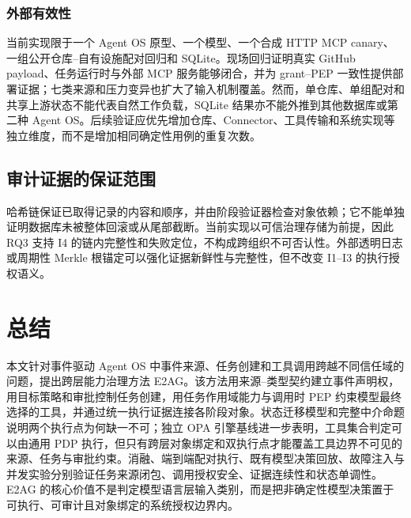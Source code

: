 \subsubsection{外部有效性}

当前实现限于一个 Agent OS 原型、一个模型、一个合成 HTTP MCP canary、一组公开仓库--自有设施配对回归和 SQLite。现场回归证明真实 GitHub payload、任务运行时与外部 MCP 服务能够闭合，并为 grant--PEP 一致性提供部署证据；七类来源和压力变异也扩大了输入机制覆盖。然而，单仓库、单组配对和共享上游状态不能代表自然工作负载，SQLite 结果亦不能外推到其他数据库或第二种 Agent OS。后续验证应优先增加仓库、Connector、工具传输和系统实现等独立维度，而不是增加相同确定性用例的重复次数。

\subsection{审计证据的保证范围}

哈希链保证已取得记录的内容和顺序，并由阶段验证器检查对象依赖；它不能单独证明数据库未被整体回滚或从尾部截断。当前实现以可信治理存储为前提，因此 RQ3 支持 I4 的链内完整性和失败定位，不构成跨组织不可否认性。外部透明日志或周期性 Merkle 根锚定可以强化证据新鲜性与完整性，但不改变 I1--I3 的执行授权语义。

\section{总结}\label{sec:conclusion-v11}

本文针对事件驱动 Agent OS 中事件来源、任务创建和工具调用跨越不同信任域的问题，提出跨层能力治理方法 E2AG。该方法用来源--类型契约建立事件声明权，用目标策略和审批控制任务创建，用任务作用域能力与调用时 PEP 约束模型最终选择的工具，并通过统一执行证据连接各阶段对象。状态迁移模型和完整中介命题说明两个执行点为何缺一不可；独立 OPA 引擎基线进一步表明，工具集合判定可以由通用 PDP 执行，但只有跨层对象绑定和双执行点才能覆盖工具边界不可见的来源、任务与审批约束。消融、端到端配对执行、既有模型决策回放、故障注入与并发实验分别验证任务来源闭包、调用授权安全、证据连续性和状态单调性。E2AG 的核心价值不是判定模型语言层输入类别，而是把非确定性模型决策置于可执行、可审计且对象绑定的系统授权边界内。

